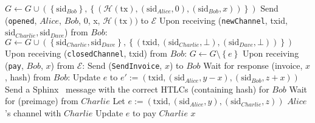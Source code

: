 \begin{algorithmic}[1]
      \State $G \leftarrow G \cup \left(\left\{\mathrm{sid}_{Bob}\right\},
      \left\{\left(\mathcal{H}\left(\mathrm{tx}\right), \left(\mathrm{sid}_{Alice},
      0\right), \left(\mathrm{sid}_{Bob}, x\right)\right)\right\}\right)$ 
      \State Send (\texttt{opened}, $Alice$, $Bob$, 0, x,
      $\mathcal{H}\left(\mathrm{tx}\right))$ to $\mathcal{E}$
    \State
    \State Upon receiving (\texttt{newChannel}, txid, $\mathrm{sid}_{Charlie},
    \mathrm{sid}_{Dave}$) from $Bob$:
        \State $G \leftarrow G \cup \left(\left\{\mathrm{sid}_{Charlie},
        \mathrm{sid}_{Dave}\right\}, \left\{\left(\mathrm{txid},
        \left(\mathrm{sid}_{Charlie}, \bot\right), \left(\mathrm{sid}_{Dave},
        \bot\right)\right)\right\}\right)$ 
      \EndIf
    \State
    \State Upon receiving (\texttt{closedChannel}, txid) from $Bob$:
        \State $G \leftarrow G \setminus \left\{e\right\}$
      \EndIf
    \State
    \State Upon receiving (\texttt{pay}, $Bob$, $x$) from $\mathcal{E}$:
      \State Send (\texttt{SendInvoice}, $x$) to $Bob$
      \State Wait for response (invoice, $x$, hash) from $Bob$:
        \State Update $e$ to $e' := \left(\mathrm{txid},
        \left(\mathrm{sid}_{Alice}, y - x\right),
        \left(\mathrm{sid}_{Bob}, z + x\right)\right)$ 
        \State Send a Sphinx~\cite{sphinx} message with the correct HTLCs (containing
        hash) for $Bob$
        \State {}
        \State Wait for (preimage) from $Charlie$
          \State Let $e := \left(\mathrm{txid}, \left(\mathrm{sid}_{Alice}, y\right),
          \left(\mathrm{sid}_{Charlie}, z\right)\right)$ $Alice$'s channel with $Charlie$
          \State Update $e$ to pay $Charlie$ $x$ 

\end{algorithmic}

